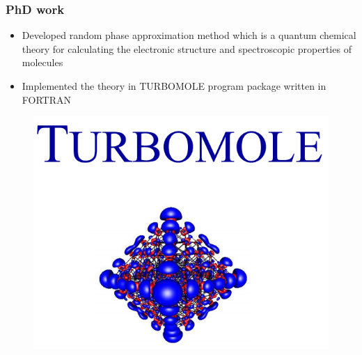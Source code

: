 \documentclass{beamer}
\begin{document}
\begin{frame}
\frametitle{PhD work}
\begin{itemize}
\item Developed random phase approximation method which is a quantum chemical theory
for calculating the electronic structure and spectroscopic properties of molecules 
\item Implemented the theory in TURBOMOLE program package written in FORTRAN 
\end{itemize}
\begin{figure}
\centering
\includegraphics[scale=0.15]{figures/tmole.png}
\end{figure}
\end{frame}
\end{document}
